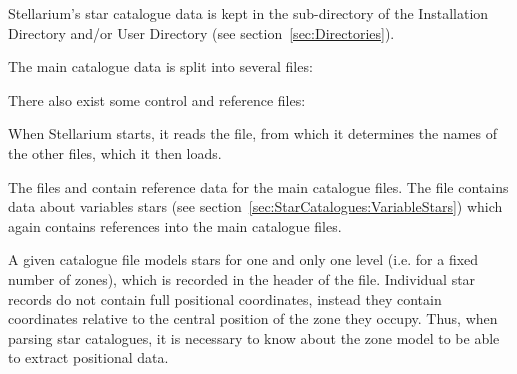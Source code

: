 Stellarium's star catalogue data is kept in the 
sub-directory of the Installation Directory and/or User Directory (see
section~\ref{sec:Directories}).

The main catalogue data is split into several files:

\begin{description}
\item[]
\item[]
\item[]
\item[]
\item[]
\item[]
\item[]
\item[]
\item[]
\end{description}

There also exist some control and reference files:

\begin{description}
\item[]
\item[]
\item[]
\item[]
\item[]
\end{description}

When Stellarium starts, it reads the  file, from which it
determines the names of the other files, which it then loads.

The files  and 
contain reference data for the main catalogue files. The
file  contains data about variables stars
(see section~\ref{sec:StarCatalogues:VariableStars}) which again contains references into 
the main catalogue files.

A given catalogue file models stars for one and only one level (i.e. for
a fixed number of zones), which is recorded in the header of the file.
Individual star records do not contain full positional coordinates,
instead they contain coordinates relative to the central position of the
zone they occupy. Thus, when parsing star catalogues, it is necessary to
know about the zone model to be able to extract positional data.

